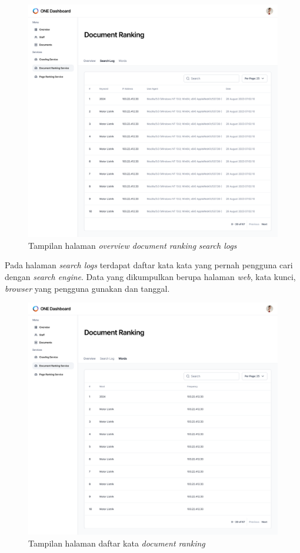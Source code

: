 \begin{enumerate}[label=\alph*)., leftmargin=1\parindent]
	\begin{figure}[H]
		\centering
		\includegraphics[keepaspectratio, width=13cm]{gambar/uiux_documentranking_search_logs.png}
		\caption{Tampilan halaman \textit{overview document ranking} \textit{search logs}}
		\label{gambar:uiux_documentranking_search_logs.png}
	\end{figure}

	Pada halaman \textit{search logs} terdapat daftar kata kata yang pernah pengguna cari dengan \textit{search engine}. Data yang dikumpulkan berupa halaman \textit{web}, kata kunci, \textit{browser} yang pengguna gunakan dan tanggal.

	\begin{figure}[H]
		\centering
		\includegraphics[keepaspectratio, width=13cm]{gambar/uiux_documentranking_words.png}
		\caption{Tampilan halaman daftar kata \textit{document ranking}}
		\label{gambar:uiux_documentranking_words.png}
	\end{figure}


\end{enumerate}
